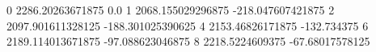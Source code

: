 0 2286.20263671875 0.0
1 2068.155029296875 -218.047607421875
2 2097.901611328125 -188.301025390625
4 2153.46826171875 -132.734375
6 2189.114013671875 -97.088623046875
8 2218.5224609375 -67.68017578125
